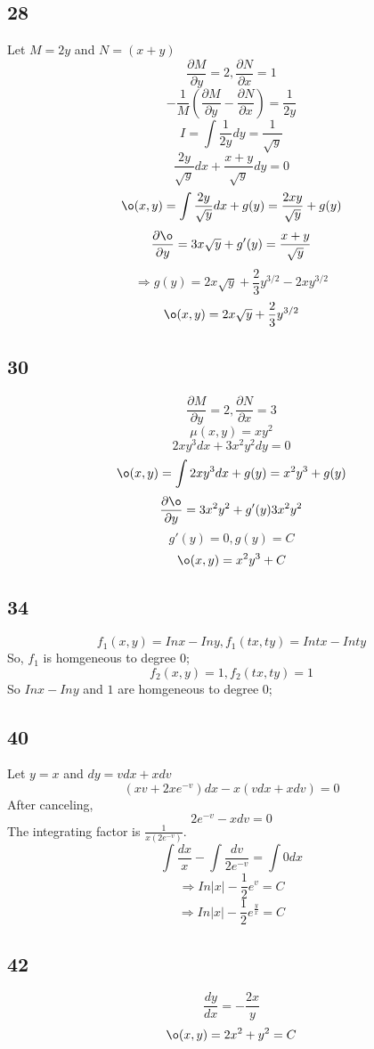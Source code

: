 \documentclass[12pt, a4paper]{IEEEtran}
\begin{document}
    \subsection*{28}
    Let $M=2y$ and $N=(x+y)$
    $$\frac{\partial M}{\partial y}=2, \frac{\partial N}{\partial x}=1$$
    $$-\frac{1}{M}(\frac{\partial M}{\partial y}-\frac{\partial N}{\partial x})=\frac{1}{2y}$$
    $$I =\int \frac{1}{2y} dy=\frac{1}{\sqrt{y}}$$
    $$\frac{2y}{\sqrt{y}}dx+\frac{x+y}{\sqrt{y}}dy=0$$
    $$\o (x,y)=\int \frac{2y}{\sqrt{y}}dx+g(y)=\frac{2xy}{\sqrt{y}}+g(y)$$
    $$\frac{\partial \o}{\partial y}=3x\sqrt{y}+g'(y)=\frac{x+y}{\sqrt{y}}$$
    $$\Rightarrow g(y)=2x\sqrt{y}+\frac{2}{3}y^{3/2}-2xy^{3/2}$$
    $$\o(x,y)=2x\sqrt{y}+\frac{2}{3}y^{3/2}$$

    \subsection*{30}
    $$\frac{\partial M}{\partial y}=2, \frac{\partial N}{\partial x}=3$$
    $$\mu(x,y)=xy^2$$
    $$2xy^3dx+3x^2y^2dy=0$$
    $$\o(x,y)=\int 2xy^3 dx+g(y)=x^2y^3+g(y)$$
    $$\frac{\partial \o}{\partial y}=3x^2y^2+g'(y)3x^2y^2$$
    $$g'(y)=0, g(y)=C$$
    $$\o(x,y)=x^2y^3+C$$

    \subsection*{34}
    $$f_1(x,y)=Inx-Iny, f_1(tx,ty)=Intx-Inty$$
    So, $f_1$ is homgeneous to degree 0;
    $$f_2(x,y)=1, f_2(tx, ty)=1$$
    So $Inx-Iny$ and $1$ are homgeneous to degree 0;

    \subsection*{40}
    Let $y=x$ and $dy=vdx+xdv$
    $$(xv+2xe^{-v})dx-x(vdx+xdv)=0$$
    After canceling,
    $$2e^{-v}-xdv=0$$
    The integrating factor is $\frac{1}{x(2e^{-v})}$.
    $$\int \frac{dx}{x}-\int \frac{dv}{2e^{-v}}=\int 0 dx$$
    $$\Rightarrow In|x|-\frac{1}{2}e^v=C$$
    $$\Rightarrow In|x|-\frac{1}{2}e^\frac{y}{x}=C$$

    \subsection*{42}
    $$\frac{dy}{dx}=-\frac{2x}{y}$$
    $$\o(x,y)=2x^2+y^2=C$$
    \vspace{6cm}
\end{document}
